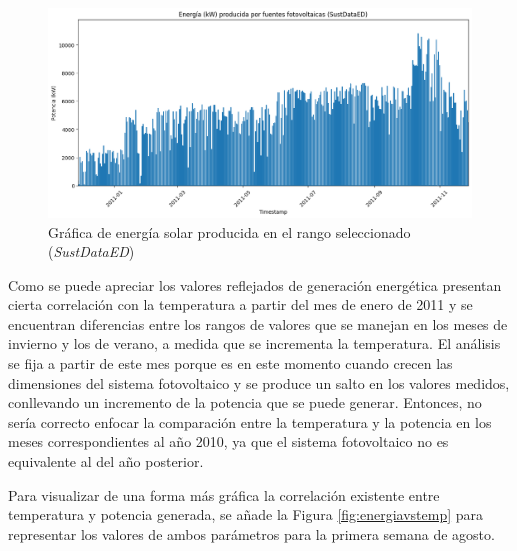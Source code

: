 \begin{figure}[H]
  \centering
  \includegraphics[width=1\textwidth]{img/diseno/matplotsolaryear.png}
  \caption{Gráfica de energía solar producida en el rango seleccionado (\textit{SustDataED})}
  \label{fig:solaryear}
\end{figure}

\vspace{3mm}

Como se puede apreciar los valores reflejados de generación energética presentan cierta correlación con la temperatura a partir del mes de enero de 2011 y se encuentran diferencias entre los rangos de valores que se manejan en los meses de invierno y los de verano, a medida que se incrementa la temperatura. El análisis se fija a partir de este mes porque es en este momento cuando crecen las dimensiones del sistema fotovoltaico y se produce un salto en los valores medidos, conllevando un incremento de la potencia que se puede generar. Entonces, no sería correcto enfocar la comparación entre la temperatura y la potencia en los meses correspondientes al año 2010, ya que el sistema fotovoltaico no es equivalente al del año posterior.

\vspace{3mm}

Para visualizar de una forma más gráfica la correlación existente entre temperatura y potencia generada, se añade la Figura \ref{fig:energiavstemp} para representar los valores de ambos parámetros para la primera semana de agosto.

\vspace{3mm}

